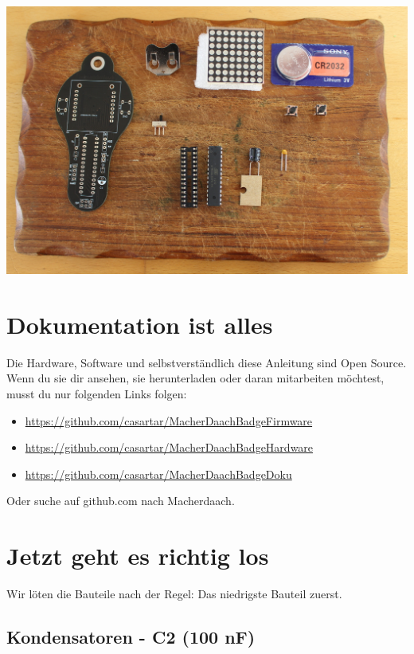 \documentclass{article}
\begin{document}
\begin{center}
\includegraphics[width=\textwidth]{Bilder2022/IMG_8183.JPG}
\label{fig:all_components}
\end{center}

\section{Dokumentation ist alles}

Die Hardware, Software und selbstverständlich diese Anleitung sind Open Source. Wenn du sie dir ansehen, sie herunterladen oder daran mitarbeiten möchtest, musst du nur folgenden Links folgen:

\begin{itemize}
	\item \url{https://github.com/casartar/MacherDaachBadgeFirmware}
	\item \url{https://github.com/casartar/MacherDaachBadgeHardware}
	\item \url{https://github.com/casartar/MacherDaachBadgeDoku}
\end{itemize}

Oder suche auf github.com nach Macherdaach.

\section{Jetzt geht es richtig los}
Wir löten die Bauteile nach der Regel: Das niedrigste Bauteil zuerst.

\subsection{Kondensatoren - C2 (100 nF)}
\end{document}
